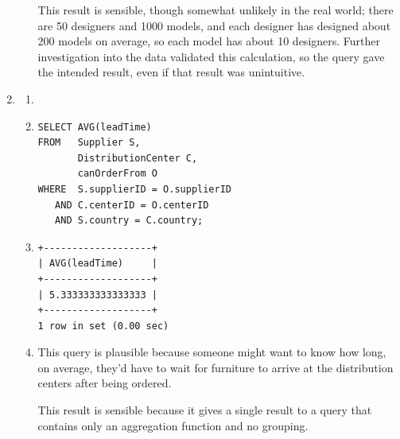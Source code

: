\documentclass[american,extrafontsizes,12pt,portrait,letterpaper,oneside,onecolumn,final]{memoir}
\begin{document}
\begin{enumerate}[leftmargin=*,label={\strong{\uline{(\emph{\Alph*})}}}]
\begin{enumerate}[leftmargin=*,widest={\strong{Explanation:}}]
This result is sensible, though somewhat unlikely in the real world; there are 50 designers and 1000 models, and each designer has designed about 200 models on average, so each model has about 10 designers.
Further investigation into the data validated this calculation, so the query gave the intended result, even if that result was unintuitive.
\end{enumerate}

\item
\begin{enumerate}[leftmargin=*,widest={\strong{Explanation:}}]
\item[\strong{Intent:}] 
\item[\strong{Query:}]
\begin{verbatim}
SELECT AVG(leadTime)
FROM   Supplier S,
       DistributionCenter C,
       canOrderFrom O
WHERE  S.supplierID = O.supplierID
   AND C.centerID = O.centerID
   AND S.country = C.country;
\end{verbatim}
\item[\strong{Result:}]
\begin{verbatim}
+-------------------+
| AVG(leadTime)     |
+-------------------+
| 5.333333333333333 |
+-------------------+
1 row in set (0.00 sec)
\end{verbatim}
\item[\strong{Explanation:}] This query is plausible because someone might want to know how long, on average, they'd have to wait for furniture to arrive at the distribution centers after being ordered.

This result is sensible because it gives a single result to a query that contains only an aggregation function and no grouping.
\end{enumerate}


\end{enumerate}
\end{document}

